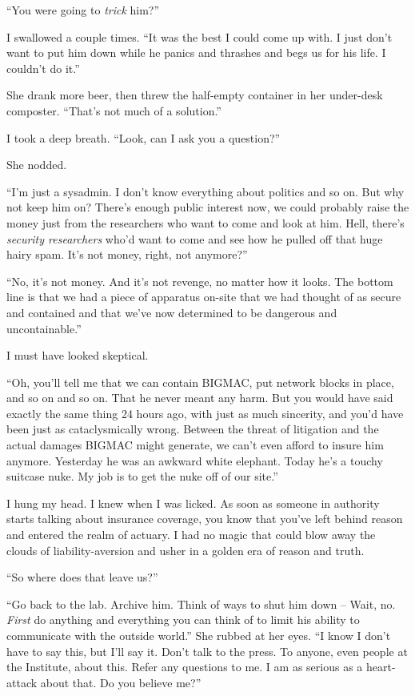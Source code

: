 “You were going to \emph{trick} him?”

I swallowed a couple times. “It was the best I could come up with. I 
just don't want to put him down while he panics and thrashes and begs 
us for his life. I couldn't do it.”

She drank more beer, then threw the half-empty container in her 
under-desk composter. “That's not much of a solution.”

I took a deep breath. “Look, can I ask you a question?”

She nodded.

“I'm just a sysadmin. I don't know everything about politics and so 
on. But why not keep him on? There's enough public interest now, we 
could probably raise the money just from the researchers who want to 
come and look at him. Hell, there's \emph{security researchers} who'd 
want to come and see how he pulled off that huge hairy spam. It's not 
money, right, not anymore?”

“No, it's not money. And it's not revenge, no matter how it looks. 
The bottom line is that we had a piece of apparatus on-site that we had 
thought of as secure and contained and that we've now determined to be 
dangerous and uncontainable.”

I must have looked skeptical.

“Oh, you'll tell me that we can contain BIGMAC, put network blocks in 
place, and so on and so on. That he never meant any harm. But you would 
have said exactly the same thing 24 hours ago, with just as much 
sincerity, and you'd have been just as cataclysmically wrong. Between 
the threat of litigation and the actual damages BIGMAC might generate, 
we can't even afford to insure him anymore. Yesterday he was an awkward 
white elephant. Today he's a touchy suitcase nuke. My job is to get the 
nuke off of our site.”

I hung my head. I knew when I was licked. As soon as someone in 
authority starts talking about insurance coverage, you know that you've 
left behind reason and entered the realm of actuary. I had no magic 
that could blow away the clouds of liability-aversion and usher in a 
golden era of reason and truth.

“So where does that leave us?”

“Go back to the lab. Archive him. Think of ways to shut him down -- 
Wait, no. \emph{First} do anything and everything you can think of to 
limit his ability to communicate with the outside world.” She rubbed 
at her eyes. “I know I don't have to say this, but I'll say it. Don't 
talk to the press. To anyone, even people at the Institute, about this. 
Refer any questions to me. I am as serious as a heart-attack about 
that. Do you believe me?”

